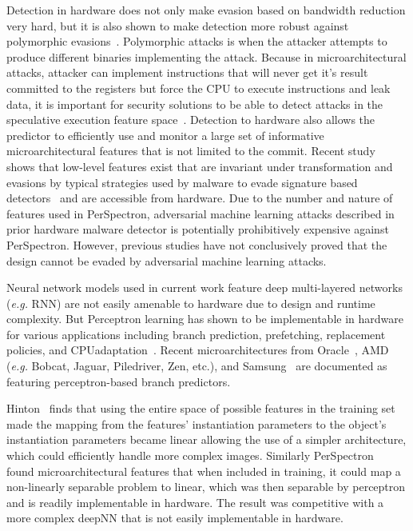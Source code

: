 Detection in hardware does not only make evasion based on bandwidth reduction very hard, but it is also shown to make detection more robust against polymorphic evasions~\cite{PerSpectron, cyclone2019, RHMD2017}. Polymorphic attacks is when the attacker attempts to produce different binaries implementing the attack. Because in microarchitectural attacks, attacker can implement instructions that will never get it’s result committed to the registers but force the CPU to execute instructions and leak data, it is important for security solutions 
to be able to detect attacks in the speculative execution feature 
space~\cite{wampler-19, PerSpectron}. Detection to hardware also allows the predictor to efficiently use and monitor a large set of informative microarchitectural features that is not limited to the commit. Recent study~\cite{PerSpectron} shows that low-level  features exist that are invariant under transformation and evasions by typical strategies
used by malware to evade signature based 
detectors~\cite{PaulKocher,paulKocherSpectreAttacks} and are accessible from hardware. Due to the number and nature of features used in PerSpectron, adversarial machine learning attacks described in prior hardware malware detector is potentially prohibitively expensive against PerSpectron. However, previous studies have not conclusively proved that the design cannot be evaded by adversarial machine learning attacks. 

Neural network models used in current work feature deep multi-layered  networks ({\em e.g.} RNN)  are not easily amenable to hardware due to design and runtime complexity. But Perceptron learning has shown to be implementable in hardware for various  applications including branch prediction, prefetching, replacement policies, and CPUadaptation~\cite{intelISCA2019}. Recent microarchitectures from Oracle~\cite{SPARCT4}, AMD ({\em e.g.} Bobcat, Jaguar, Piledriver, Zen, etc.), and Samsung~\cite{Mongoose,M3} are documented as featuring perceptron-based branch predictors.


Hinton~\cite{Hinton1985shape} 
finds that using the entire space of possible features in the 
training set made the 
mapping from the features’ instantiation parameters to the
object’s instantiation parameters became linear allowing the use of a simpler architecture, which could efficiently 
handle more complex images.   Similarly PerSpectron~\cite{PerSpectron} found microarchitectural features that when included in training, it could map a non-linearly separable problem to linear, which was then 
separable by perceptron and is readily implementable in hardware. The result was competitive 
with a more complex deepNN that is not easily implementable in hardware.


